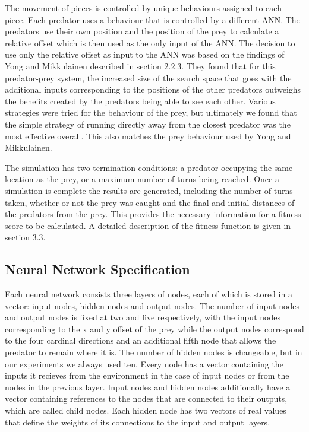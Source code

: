 \documentclass[12pt]{article} %
\begin{document}
The movement of pieces is controlled by unique behaviours assigned to each piece. Each predator uses a behaviour that is controlled by a different ANN. The predators use their own position and the position of the prey to calculate a relative offset which is then used as the only input of the ANN. The decision to use only the relative offset as input to the ANN was based on the findings of Yong and Mikkulainen \cite{Yong2001} described in section 2.2.3. They found that for this predator-prey system, the increased size of the search space that goes with the additional inputs corresponding to the positions of the other predators outweighs the benefits created by the predators being able to see each other. Various strategies were tried for the behaviour of the prey, but ultimately we found that the simple strategy of running directly away from the closest predator was the most effective overall. This also matches the prey behaviour used by Yong and Mikkulainen.

The simulation has two termination conditions: a predator occupying the same location as the prey, or a maximum number of turns being reached. Once a simulation is complete the results are generated, including the number of turns taken, whether or not the prey was caught and the final and initial distances of the predators from the prey. This provides the necessary information for a fitness score to be calculated. A detailed description of the fitness function is given in section 3.3.

\subsection{Neural Network Specification}

Each neural network consists three layers of nodes, each of which is stored in a vector: input nodes, hidden nodes and output nodes. The number of input nodes and output nodes is fixed at two and five respectively, with the input nodes corresponding to the x and y offset of the prey while the output nodes correspond to the four cardinal directions and an additional fifth node that allows the predator to remain where it is. The number of hidden nodes is changeable, but in our experiments we always used ten. Every node has a vector containing the inputs it recieves from the environment in the case of input nodes or from the nodes in the previous layer. Input nodes and hidden nodes additionally have a vector containing references to the nodes that are connected to their outputs, which are called child nodes. Each hidden node has two vectors of real values that define the weights of its connections to the input and output layers.
\end{document}
